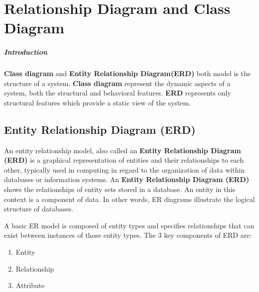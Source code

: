 \chapter{Relationship Diagram and Class Diagram}
 
\noindent 
\paragraph{Introduction}

\noindent \textbf{Class diagram} and \textbf{Entity Relationship Diagram(ERD)} both model is the structure of a system. \textbf{Class diagram} represent the dynamic aspects of a system, both the structural and behavioral features. \textbf{ERD} represents only structural features which provide a static view of the system.


\noindent 

\noindent 


\section{ Entity Relationship Diagram (ERD)}

\noindent An entity relationship model, also called an \textbf{Entity Relationship Diagram (ERD)} is a graphical representation of entities and their relationships to each other, typically used in computing in regard to the organization of data within databases or information systems. An \textbf{Entity Relationship Diagram (ERD)} shows the relationships of entity sets stored in a database. An entity in this context is a component of data. In other words, ER diagrams illustrate the logical structure of databases.

\noindent A basic ER model is composed of entity types and specifies relationships that can exist between instances of those entity types. The 3 key components of ERD are:

\begin{enumerate}
\item  Entity

\item  Relationship

\item  Attribute
\end{enumerate}

